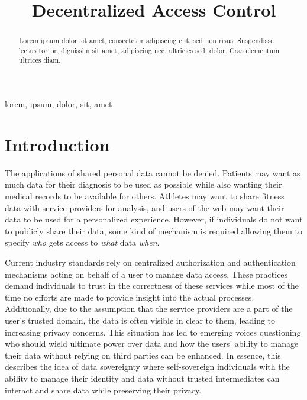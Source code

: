\documentclass[conference]{IEEEtran}
\begin{document}
\title{Decentralized Access Control}%

\author{
}

\maketitle

\begin{abstract}
  Lorem ipsum dolor sit amet, consectetur adipiscing elit. sed non risus. Suspendisse lectus tortor, dignissim sit amet, adipiscing nec, ultricies sed, dolor. Cras elementum ultrices diam.
\end{abstract}

\begin{IEEEkeywords}
  lorem, ipsum, dolor, sit, amet
\end{IEEEkeywords}

\section{Introduction}
The applications of shared personal data cannot be denied.
Patients may want as much data for their diagnosis to be used as possible while also wanting their medical records to be available for others. \cite{hollis_share_2016}
Athletes may want to share fitness data with service providers for analysis, and users of the web may want their data to be used for a personalized experience.\cite{nasir_council_nodate}
However, if individuals do not want to publicly share their data, some kind of mechanism is required allowing them to specify \textit{who} gets access to \textit{what} data \textit{when}.

Current industry standards rely on centralized authorization and authentication mechanisms acting on behalf of a user to manage data access. \cite{hardt_oauth_2012,noauthor_googles_nodate}
These practices demand individuals to trust in the correctness of these services while most of the time no efforts are made to provide insight into the actual processes.
Additionally, due to the assumption that the service providers are a part of the user's trusted domain, the data is often visible in clear to them, leading to increasing privacy concerns.
This situation has led to emerging voices questioning who should wield ultimate power over data and how the users' ability to manage their data without relying on third parties can be enhanced. \cite{noauthor_w3f_nodate}
In essence, this describes the idea of data sovereignty where self-sovereign individuals with the ability to manage their identity and data without trusted intermediates can interact and share data while preserving their privacy. \cite{ernstberger_sok_2023}
\end{document}
